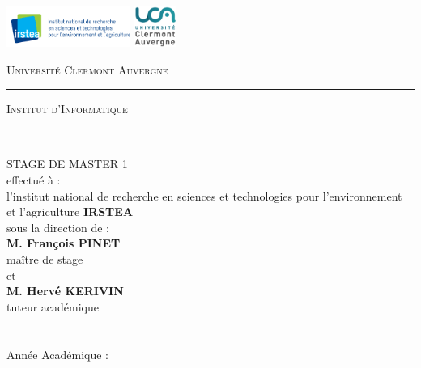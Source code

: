 \newenvironment{changemargin}[2]{\begin{list}{}{%
\setlength{\topsep}{0pt}%
\setlength{\leftmargin}{0pt}%
\setlength{\rightmargin}{0pt}%
\setlength{\listparindent}{\parindent}%
\setlength{\itemindent}{\parindent}%
\setlength{\parsep}{0pt plus 1pt}%
\addtolength{\leftmargin}{#1}%
\addtolength{\rightmargin}{#2}%
}\item }{\end{list}}
\begin{changemargin}{-4cm}{-2cm}
\newcommand{\HRule}{\rule[2mm]{10mm}{0.5mm}}
\includegraphics[height=50px]{detailPrevisionnelRapport/Logo-Irstea.png}
\hspace*{\fill}
\includegraphics[height=50px]{detailPrevisionnelRapport/Logo-UCA.png}
\\[1cm]
\begin{center}
    \textsc{\large Université Clermont Auvergne}\\[0.5mm]
    \HRule \textsc{ Institut d'Informatique} \HRule 
    \\[1cm]
    STAGE DE MASTER 1
    \\[1cm]
     effectué à : 
     \\
   l'institut national de recherche en sciences et technologies pour l'environnement et l'agriculture
   \textbf{IRSTEA}
   \\[0.5cm]
    sous la direction de : 
    \\[1cm]
    \textbf{M. François PINET}
    \\
    maître de stage
    \\[0.5cm]
    et
    \\[0.5cm]
  \textbf{M. Hervé KERIVIN}
    \\
    tuteur académique
    \\[2cm]
    
    {\huge \Title}
    \\[1cm]

    \textbf{\@author}
    \\[0.5cm]

    Année Académique : \@date
\end{center}
\end{changemargin}

